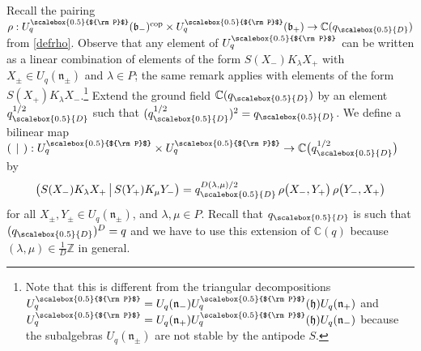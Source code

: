 \documentclass[11pt]{amsart}
\newcommand{\mc}{\mathbb{C}}
\newcommand{\qD}{q_{\scalebox{0.5}{D}}}
\newcommand{\D}{{\scalebox{0.5}{D}}}
\newcommand{\Pup}{{\scalebox{0.5}{${\rm P}$}}}
\begin{document}
Recall the pairing $\rho : U_q^\Pup(\mathfrak{b}_-)^{\rm cop} \times U_q^\Pup(\mathfrak{b}_+) \to \mathbb{C}(q_\D)$ from \eqref{defrho}. Observe that any element of $U_q^\Pup$ can be written as a linear combination of elements of the form $S(X_-)K_\lambda X_+$ with $X_\pm \in U_q(\mathfrak{n}_\pm)$ and $\lambda \in P$; the same remark applies with elements of the form $S(X_+)K_\lambda X_-$.\footnote{Note that this is different from the triangular decompositions $U_q^\Pup = U_q(\mathfrak{n}_-)U_q^\Pup(\mathfrak{h})U_q(\mathfrak{n}_+)$ and $U_q^\Pup = U_q(\mathfrak{n}_+)U_q^\Pup(\mathfrak{h})U_q(\mathfrak{n}_-)$ because the subalgebras $U_q(\mathfrak{n}_\pm)$ are not stable by the antipode $S$.} Extend the ground field $\mc(\qD)$ by an element $\qD^{1/2}$ such that $(\qD^{1/2})^2 = \qD$. We define a bilinear map $(\:\,|\,\:) : U_q^\Pup \times U_q^\Pup \to \mc\bigl(\qD^{1/2}\bigr)$ by 
\begin{equation}\label{qKillingnous}
\bigl( S(X_-) K_\lambda X_+ \,\big|\, S(Y_+) K_\mu Y_- \bigr) = \qD^{D(\lambda,\mu)/2} \, \rho\bigl(X_-, Y_+\bigr) \, \rho\bigl(Y_-,X_+\bigr)
\end{equation}
for all $X_\pm,Y_\pm\in U_q(\mathfrak{n}_\pm)$, and $\lambda, \mu\in P$. Recall that $\qD$ is such that $(\qD)^D  = q$ and we have to use this extension of $\mathbb{C}(q)$ because $\textstyle (\lambda,\mu) \in \frac{1}{D}\mathbb{Z}$ in general.
\smallskip
\end{document}

